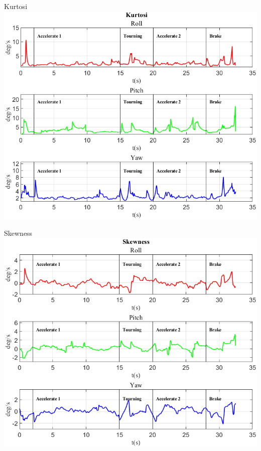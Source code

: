 \documentclass[beamer]{standalone}
\begin{document}
	\begin{frame}{{Kurtosi}}
		\centering\includegraphics[height=.8\textheight]{figure/VAng/Kurtosi}
	\end{frame}
	
	\begin{frame}{{Skewness}}
		\centering\includegraphics[height=.8\textheight]{figure/VAng/Skewness}
	\end{frame}
	
	
\end{document}
